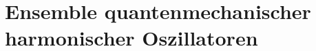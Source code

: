 \section{Ensemble quantenmechanischer harmonischer Oszillatoren}
\subsection{}
\subsection{}
\subsection{}
\subsection{}
\subsection{}

